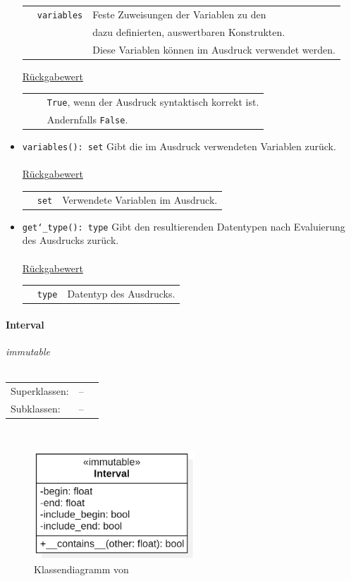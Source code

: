 \documentclass{article}
\newcommand{\classheader}[2][]{\paragraph{#2}
\mbox{}\textit{#1}\\\\}
\newcommand{\classref}[1]{\texttt{\nameref{cls:#1}}}
\begin{document}
\begin{itemize}
\begin{tabular}{lll}
 & \texttt{variables} & Feste Zuweisungen der Variablen zu den \\&& dazu definierten, auswertbaren Konstrukten. \\&& Diese Variablen können im Ausdruck verwendet werden. \\
\end{tabular}

\underline{Rückgabewert}

\begin{tabular}{lll}
 & \classref{ErrorReport} & \texttt{True}, wenn der Ausdruck syntaktisch korrekt ist. \\&& Andernfalls \texttt{False}. \\
\end{tabular}

\item \texttt{variables(): set} \newline Gibt die im Ausdruck verwendeten Variablen zurück.
\\\\
\underline{{Rückgabewert}}

\begin{tabular}{lll}
 & \texttt{set} & Verwendete Variablen im Ausdruck. \\
\end{tabular}

\item \texttt{get\char`_type(): type} \newline Gibt den resultierenden Datentypen nach Evaluierung des Ausdrucks zurück.
\\\\
\underline{{Rückgabewert}}

\begin{tabular}{lll}
 & \texttt{type} & Datentyp des Ausdrucks. \\
\end{tabular}
\end{itemize}


\newpage
\classheader[\flqq{}immutable\frqq]{Interval}\label{cls:Interval}
\begin{tabular}{lll}
 Superklassen: & --\\
 Subklassen: & --\\
\end{tabular}\\
\begin{figure}[H]%
    \centering
    \includegraphics[width=6cm]{docs/entwurf/Entwurf_dokument/img/cls/model/Interval.png}
    \caption{Klassendiagramm von \classref{Interval}}
\end{figure}
\end{document}
